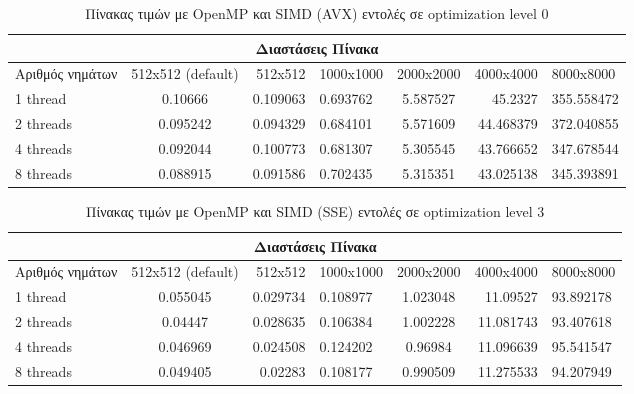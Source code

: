 \documentclass[greek,booktabs,8pt,flagBlueCMYK]{report}
\begin{document}
\begin{table}[H]
\begin{center}
\label{tab:9} 
\begin{tabular}{| l | c | r | l | c | r | l |}
  \hline
  \multicolumn{7}{|c|}{Διαστάσεις Πίνακα} \\ \hline
  Αριθμός νημάτων & 512x512 (default) & 512x512 & 1000x1000 & 2000x2000 & 4000x4000 & 8000x8000\\ \hline 
  1 thread   & 0.10666 &   0.109063 &  0.693762   & 5.587527  & 45.2327 &  355.558472 \\ \hline
  2 threads  & 0.095242 &   0.094329  &  0.684101   & 5.571609  & 44.468379 &  372.040855\\ \hline
  4 threads  & 0.092044  &   0.100773  &  0.681307   & 5.305545  & 43.766652 &  347.678544 \\ \hline
  8 threads  & 0.088915 &   0.091586  &  0.702435   & 5.315351  & 43.025138 &  345.393891 \\ \hline
\end{tabular}
\caption {Πίνακας τιμών με OpenMP και SIMD (AVX) εντολές σε optimization level 0}
\end{center}
\end{table}

\begin{table}[H]
\begin{center}
\label{tab:10} 
\begin{tabular}{| l | c | r | l | c | r | l |}
  \hline
  \multicolumn{7}{|c|}{Διαστάσεις Πίνακα} \\ \hline
  Αριθμός νημάτων & 512x512 (default) & 512x512 & 1000x1000 & 2000x2000 & 4000x4000 & 8000x8000\\ \hline 
  1 thread   & 0.055045 &   0.029734 & 0.108977 & 1.023048 & 11.09527 & 93.892178  \\ \hline
  2 threads  & 0.04447 & 0.028635 & 0.106384 & 1.002228 & 11.081743 & 93.407618 \\ \hline
  4 threads  & 0.046969 & 0.024508 & 0.124202 & 0.96984 & 11.096639 & 95.541547 \\ \hline
  8 threads  & 0.049405 & 0.02283 & 0.108177 & 0.990509 & 11.275533 & 94.207949 \\ \hline
\end{tabular}
\caption {Πίνακας τιμών με OpenMP και SIMD (SSE) εντολές σε optimization level 3}
\end{center}
\end{table}
\end{document}
